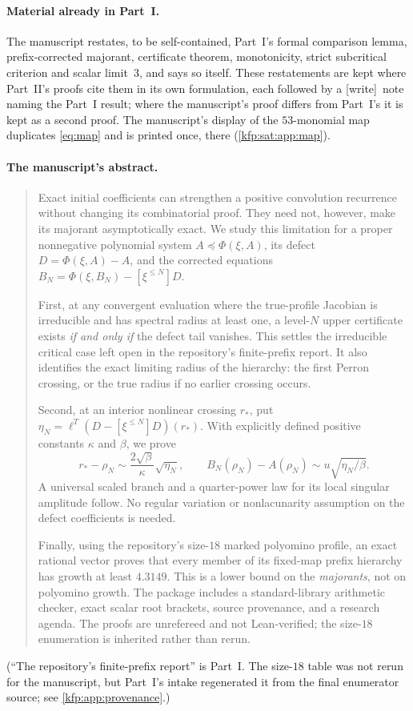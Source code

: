 \documentclass[11pt,a4paper]{article}
\theoremstyle{definition}
\theoremstyle{remark}
\newcommand{\wtag}{\textsf{\small[write]}}
\begin{document}
\paragraph{Material already in Part~I.} The manuscript restates, to be
self-contained, Part~I's formal comparison lemma, prefix-corrected majorant,
certificate theorem, monotonicity, strict subcritical criterion and scalar
limit~$3$, and says so itself. These restatements are kept where Part~II's
proofs cite them in its own formulation, each followed by a \wtag\ note
naming the Part~I result; where the manuscript's proof differs from Part~I's
it is kept as a second proof. The manuscript's display of the $53$-monomial
map duplicates \eqref{eq:map} and is printed once, there
(\cref{kfp:sat:app:map}).

\paragraph{The manuscript's abstract.}
\begin{quote}\small
Exact initial coefficients can strengthen a positive convolution recurrence
without changing its combinatorial proof. They need not, however, make its
majorant asymptotically exact. We study this limitation for a proper
nonnegative polynomial system $A\preceq\Phi(\xi,A)$, its defect
$D=\Phi(\xi,A)-A$, and the corrected equations
$B_N=\Phi(\xi,B_N)-[\xi^{\le N}]D$.

First, at any convergent evaluation where the true-profile Jacobian is
irreducible and has spectral radius at least one, a level-$N$ upper
certificate exists \emph{if and only if} the defect tail vanishes. This
settles the irreducible critical case left open in the repository's
finite-prefix report. It also identifies the exact limiting radius of the
hierarchy: the first Perron crossing, or the true radius if no earlier
crossing occurs.

Second, at an interior nonlinear crossing $r_*$, put
$\eta_N=\ell^T(D-[\xi^{\le N}]D)(r_*)$. With explicitly defined positive
constants $\kappa$ and $\beta$, we prove
\[
 r_*-\rho_N\sim\frac{2\sqrt\beta}{\kappa}\sqrt{\eta_N},
 \qquad
 B_N(\rho_N)-A(\rho_N)
 \sim u\sqrt{\eta_N/\beta}.
\]
A universal scaled branch and a quarter-power law for its local singular
amplitude follow. No regular variation or nonlacunarity assumption on the
defect coefficients is needed.

Finally, using the repository's size-$18$ marked polyomino profile, an
exact rational vector proves that every member of its fixed-map prefix
hierarchy has growth at least $4.3149$. This is a lower bound on the
\emph{majorants}, not on polyomino growth. The package includes a
standard-library arithmetic checker, exact scalar root brackets, source
provenance, and a research agenda. The proofs are unrefereed and not
Lean-verified; the size-$18$ enumeration is inherited rather than rerun.
\end{quote}
(``The repository's finite-prefix report'' is Part~I. The size-$18$ table
was not rerun for the manuscript, but Part~I's intake regenerated it from
the final enumerator source; see \cref{kfp:app:provenance}.)
\end{document}
